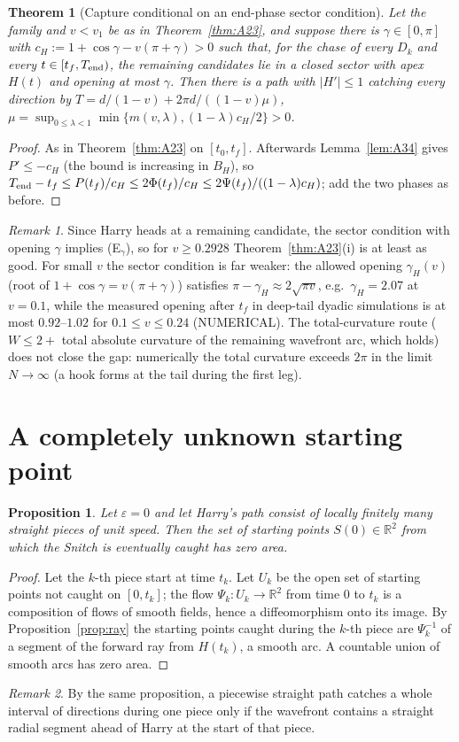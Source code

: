 \documentclass[11pt]{article}
\newtheorem{theorem}{Theorem}
\newtheorem{proposition}{Proposition}
\theoremstyle{remark}\newtheorem{remark}{Remark}
\newcommand{\R}{\mathbb{R}}
\begin{document}
\begin{theorem}[Capture conditional on an end-phase sector condition]\label{thm:A35}
Let the family and $v<v_1$ be as in Theorem~\ref{thm:A23}, and suppose there is $\gamma\in[0,\pi]$ with
$c_H:=1+\cos\gamma-v(\pi+\gamma)>0$ such that, for the chase of every $D_k$ and every $t\in[t_f,T_{\rm end})$, the remaining candidates
lie in a closed sector with apex $H(t)$ and opening at most $\gamma$. Then there is a path with $|H'|\le1$ catching every direction
by $T=d/(1-v)+2\pi d/((1-v)\mu)$, $\mu=\sup_{0\le\lambda<1}\min\{m(v,\lambda),(1-\lambda)c_H/2\}>0$.
\end{theorem}
\begin{proof}
As in Theorem~\ref{thm:A23} on $[t_0,t_f]$. Afterwards Lemma~\ref{lem:A34} gives $P'\le-c_H$ (the bound is increasing in $B_H$),
so $T_{\rm end}-t_f\le P(t_f)/c_H\le2\Phi(t_f)/c_H\le2\Psi(t_f)/((1-\lambda)c_H)$; add the two phases as before.
\end{proof}
\begin{remark}
Since Harry heads at a remaining candidate, the sector condition with opening $\gamma$ implies (E$_\gamma$), so for $v\ge0.2928$
Theorem~\ref{thm:A23}(i) is at least as good. For small $v$ the sector condition is far weaker: the allowed opening $\gamma_H(v)$
(root of $1+\cos\gamma=v(\pi+\gamma)$) satisfies $\pi-\gamma_H\approx2\sqrt{\pi v}$, e.g.\ $\gamma_H=2.07$ at $v=0.1$, while the measured
opening after $t_f$ in deep-tail dyadic simulations is at most $0.92$--$1.02$ for $0.1\le v\le0.24$ (NUMERICAL). The total-curvature
route ($W\le2+$ total absolute curvature of the remaining wavefront arc, which holds) does not close the gap: numerically the
total curvature exceeds $2\pi$ in the limit $N\to\infty$ (a hook forms at the tail during the first leg).
\end{remark}

\section{A completely unknown starting point}
\begin{proposition}\label{prop:null}
Let $\varepsilon=0$ and let Harry's path consist of locally finitely many straight pieces of unit speed. Then the set of starting
points $S(0)\in\R^2$ from which the Snitch is eventually caught has zero area.
\end{proposition}
\begin{proof}
Let the $k$-th piece start at time $t_k$. Let $U_k$ be the open set of starting points not caught on $[0,t_k]$; the flow
$\Psi_k:U_k\to\R^2$ from time $0$ to $t_k$ is a composition of flows of smooth fields, hence a diffeomorphism onto its image.
By Proposition~\ref{prop:ray} the starting points caught during the $k$-th piece are $\Psi_k^{-1}$ of a segment of the forward
ray from $H(t_k)$, a smooth arc. A countable union of smooth arcs has zero area.
\end{proof}
\begin{remark}
By the same proposition, a piecewise straight path catches a whole interval of directions during one piece only if the
wavefront contains a straight radial segment ahead of Harry at the start of that piece.
\end{remark}
\end{document}
